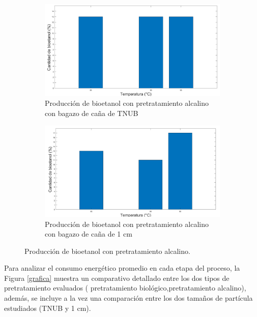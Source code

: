 \documentclass[12pt]{article}
\begin{document}
		
				\begin{figure}[h]
				\centering
				\begin{subfigure}[b]{0.49\textwidth}
					\includegraphics[width=\linewidth]{imagenes/alcalino_TNUB}
					\caption{Producción de bioetanol con pretratamiento alcalino con bagazo de caña  de TNUB}
					\label{bipoo}
				\end{subfigure}
				\hfill %
				\begin{subfigure}[b]{0.49\textwidth}
					\includegraphics[width=\linewidth]{imagenes/alcalino_1cm}
					\caption{Producción de bioetanol con pretratamiento alcalino con bagazo de caña de 1 cm}
					\label{fig:imagen11}
				\end{subfigure}
				\caption{Producción de bioetanol con pretratamiento alcalino.}
				\label{producción}
			\end{figure}
			
Para analizar el consumo energético promedio en cada etapa del proceso, la Figura \ref{grafica} muestra un comparativo detallado entre los dos tipos de pretratamiento evaluados ( pretratamiento biológico,pretratamiento alcalino), además, se incluye a la vez una comparación entre los dos tamaños de partícula estudiados (TNUB y 1 cm).
			
\end{document}
